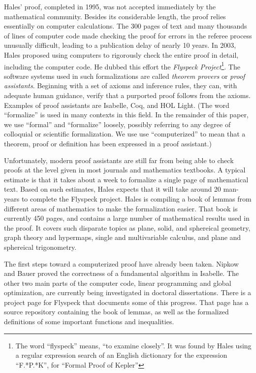 Hales' proof, completed in 1995, was not accepted immediately by the
mathematical community.  Besides its considerable length, the proof
relies essentially on computer calculations.  The 300 pages of text
and many thousands of lines of computer code made checking the proof
for errors in the referee process unusually difficult, leading to a
publication delay of nearly 10 years.  In 2003, Hales proposed using
computers to rigorously check the entire proof in detail, including
the computer code.  He dubbed this effort the \textit{Flyspeck
  Project}\footnote{The word ``flyspeck'' means, ``to examine
  closely''.  It was found by Hales using a regular expression search
  of an English dictionary for the expression ``F.*P.*K'', for
  ``Formal Proof of Kepler''}.  The software systems used in such
formalizations are called \textit{theorem provers} or \textit{proof
  assistants}.  Beginning with a set of axioms and inference rules,
they can, with adequate human guidance, verify that a purported proof
follows from the axioms.  Examples of proof assistants are
Isabelle\cite{Paulson:1994:Isabelle}, Coq\cite{Bertot:2004:CoqBook},
and HOL Light\cite{Harrison:2000:HOL-Light}. (The word ``formalize'' is used
in many contexts in this field.  In the remainder of this paper, we
use ``formal'' and ``formalize'' loosely, possibly referring to 
any degree of colloquial or scientific formalization.  We use
use ``computerized'' to mean that a theorem, proof or definition has
been expressed in a proof assistant.)

  Unfortunately, modern proof assistants are still far from being able to check
proofs at the level given in most journals and mathematics textbooks.  A typical
estimate is that it takes about a week to formalize a single page of mathematical
text.  Based on such estimates, Hales expects that it will take 
around 20 man-years to complete the Flyspeck project.  
Hales is compiling a book\cite{Hales:2007:FlyspeckBook}
of lemmas from different areas of mathematics to make the formalization easier.    
That book is currently 450 pages, and contains a large number of mathematical
results used in the proof.  It covers such disparate topics
as plane, solid, and sphereical geometry, graph theory and hypermaps, single and
multivariable calculus, and plane and sphereical trigonometry.

The first steps toward a computerized proof have already been taken.
Nipkow and Bauer\cite{Nipkow:2005:Tame} proved the correctness of a
fundamental algorithm in Isabelle.  The other two main parts of the
computer code, linear programming and global optimization, are
currently being investigated in doctoral
dissertations\cite{Zumkeller:2006:TaylorModels,Obua:2005:LinearPrograms}.
There is a project page\cite{website:FlyspeckProjectPage} for Flyspeck
that documents some of this progress.  That page has a source
repository containing the book of lemmas, as well as the formalized
definitions of some important functions and inequalities.  

